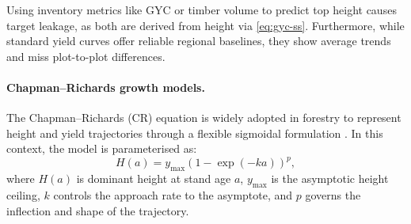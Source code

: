 Using inventory metrics like GYC or timber volume to predict top height causes target leakage, as both are derived from height via \eqref{eq:gyc-ss}. Furthermore, while standard yield curves \cite{edwards1981Yield_C1_SS} offer reliable regional baselines, they show average trends and miss plot-to-plot differences.



\paragraph*{Chapman--Richards growth models.}
The Chapman--Richards (CR) equation is widely adopted in forestry to represent height and yield trajectories through a flexible sigmoidal formulation \cite{richards1959Flexible_C2_CR,pommerening2015Methods_C2_CR,manso2021Dynamic_C2_CR}. In this context, the model is parameterised as:
\begin{equation}
H(a) = y_{\max}\left(1-\exp(-ka)\right)^p,
\label{eq:background-cr}
\end{equation}
where $H(a)$ is dominant height at stand age $a$, $y_{\max}$ is the asymptotic height ceiling, $k$ controls the approach rate to the asymptote, and $p$ governs the inflection and shape of the trajectory.


